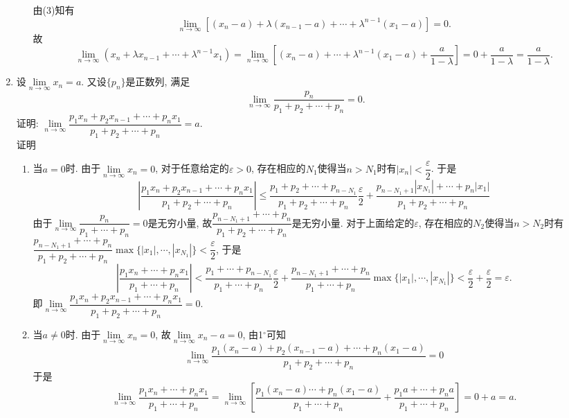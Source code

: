 \documentclass[UTF8,a4paper,20pt]{article}
\begin{document}
\begin{enumerate}
\begin{enumerate}[1$^{\circ}$]
由(3)知有
\[\lim\limits_{n\to\infty}[(x_n-a)+\lambda (x_{n-1}-a)+ \cdots+\lambda^{n-1}(x_1-a)]=0.\]
故
\[\lim\limits_{n\to\infty}(x_n+\lambda x_{n-1}+\cdots+\lambda^{n-1}x_1)=\lim\limits_{n\to\infty}\left[(x_n-a)+\cdots+\lambda^{n-1}(x_1-a)+\dfrac{a}{1-\lambda}\right]=0+\dfrac{a}{1-\lambda}=\dfrac{a}{1-\lambda}.\]
	\end{enumerate}

\item 设$\lim\limits_{n\to\infty}x_n=a$. 又设$\{p_n\}$是正数列, 满足
\[ \lim\limits_{n\to\infty}\dfrac{p_n}{p_1+p_2+\cdots+p_n}=0.\]
证明: $\lim\limits_{n\to\infty}\dfrac{p_1x_n+p_2x_{n-1}+\cdots+p_nx_1}{p_1+p_2+\cdots+p_n}=a$.\\
{\heiti 证明}
\begin{enumerate}[1$^{\circ}$]
\item 当$a=0$时. 由于$\lim\limits_{n\to\infty}x_n=0$, 对于任意给定的$\varepsilon>0$, 存在相应的$N_1$使得当$n>N_1$时有$|x_n|<\dfrac{\varepsilon}{2}$. 于是
\[ \left|\dfrac{p_1x_n+p_2x_{n-1}+\cdots+p_nx_1}{p_1+p_2+\cdots+p_n}\right|\leqslant \dfrac{p_1+p_2+\cdots+p_{n-N_1}}{p_1+p_2+\cdots+p_n}\dfrac{\varepsilon}{2}+\dfrac{p_{n-N_1+1}|x_{N_1}|+\cdots+p_n|x_1|}{p_1+p_2+\cdots+p_n}\]
由于$\lim\limits_{n\to\infty}\dfrac{p_n}{p_1+\cdots+p_n}=0$是无穷小量, 故$\dfrac{p_{n-N_1+1}+\cdots+p_n}{p_1+p_2+\cdots+p_n}$是无穷小量. 对于上面给定的$\varepsilon$, 存在相应的$N_2$使得当$n>N_2$时有$\dfrac{p_{n-N_1+1}+\cdots+p_n}{p_1+p_2+\cdots+p_n}\max\{|x_1|,\cdots,|x_{N_1}|\}<\dfrac{\varepsilon}{2}$, 于是
\[ \left|\dfrac{p_1x_n+\cdots+p_nx_1}{p_1+\cdots+p_n}\right|<\dfrac{p_1+\cdots+p_{n-N_1}}{p_1+\cdots+p_n}\dfrac{\varepsilon}{2}+\dfrac{p_{n-N_1+1}+\cdots+p_n}{p_1+\cdots+p_n}\max\{|x_1|,\cdots,|x_{N_1}|\}<\dfrac{\varepsilon}{2}+\dfrac{\varepsilon}{2}=\varepsilon.\]
即$\lim\limits_{n\to\infty}\dfrac{p_1x_n+p_2x_{n-1}+\cdots+p_nx_1}{p_1+p_2+\cdots+p_n}=0$. 
\item 当$a\neq 0$时. 由于$\lim\limits_{n\to\infty}x_n=0$, 故$\lim\limits_{n\to\infty}x_n-a=0$, 由1$^{\circ}$可知
\[\lim\limits_{n\to\infty}\dfrac{p_1(x_n-a)+p_2(x_{n-1}-a)+\cdots+p_n(x_1-a)}{p_1+p_2+\cdots+p_n}=0\]
于是
\[\lim\limits_{n\to\infty}\dfrac{p_1x_n+\cdots+p_nx_1}{p_1+\cdots+p_n}=\lim\limits_{n\to\infty}\left[\dfrac{p_1(x_n-a)\cdots+p_n(x_1-a)}{p_1+\cdots+p_n}+\dfrac{p_1a+\cdots+p_na}{p_1+\cdots+p_n}\right]=0+a=a.\]
\end{enumerate}


\end{enumerate}
\end{document}

